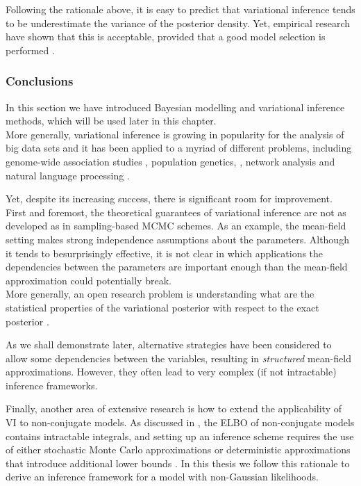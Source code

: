 Following the rationale above, it is easy to predict that variational inference tends to be underestimate the variance of the posterior density. Yet, empirical research have shown that this is acceptable, provided that a good model selection is performed \cite{Blei2006}.


\subsubsection{Conclusions}

In this section we have introduced Bayesian modelling and variational inference methods, which will be used later in this chapter.\\
More generally, variational inference is growing in popularity for the analysis of big data sets and it has been applied to a myriad of different problems, including genome-wide association studies \cite{Carbonetto2012}, population genetics, \cite{Raj2014}, network analysis \cite{Sanguinetti2006} and natural language processing \cite{Blei2003}.

Yet, despite its increasing success, there is significant room for improvement. First and foremost, the theoretical guarantees of variational inference are not as developed as in sampling-based MCMC schemes\cite{Blei2016,Zhang2017,Nakajima2007}. As an example, the mean-field setting makes strong independence assumptions about the parameters.  Although it tends to besurprisingly effective, it is not clear in which applications the dependencies between the parameters are important enough than the mean-field approximation could potentially break.\\
More generally, an open research problem is understanding what are the statistical properties of the variational posterior with respect to the exact posterior \cite{Blei2016,Zhang2017}.

As we shall demonstrate later, alternative strategies have been considered to allow some dependencies between the variables, resulting in \textit{structured} mean-field approximations\cite{Hoffman2014,Titsias2011}. However, they often lead to very complex (if not intractable) inference frameworks. 

Finally, another area of extensive research is how to extend the applicability of VI to non-conjugate models. As discussed in , the ELBO of non-conjugate models contains intractable integrals, and setting up an inference scheme requires the use of either stochastic Monte Carlo approximations or deterministic approximations that introduce additional lower bounds \cite{Zhang2017,Seeger2012,Khan2017}. In this thesis we follow this rationale to derive an inference framework for a model with non-Gaussian likelihoods.
